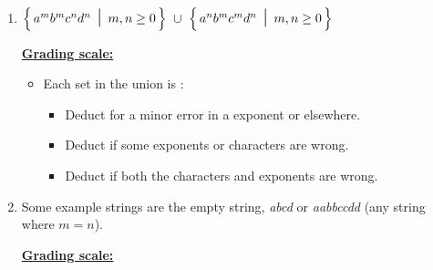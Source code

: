 \documentclass[11pt,fleqn]{article}
\begin{document}
\begin{enumerate}
\begin{enumerate}
            \item \(
                    \left\{ \,
                      a^mb^mc^nd^n \mbox{\Large \ensuremath{\ \mid \ }} m, n \ge 0  \,
                    \right\}
                    \ \cup \
                    \left\{  \,
                      a^nb^mc^md^n \mbox{\Large \ensuremath{\ \mid \ }} m, n \ge 0  \,
                    \right\}
                  \)

                  \begin{info}{\textbf{\underline{Grading scale:}}}

                    \begin{itemize}

                      \addtolength{\itemsep}{2mm}

                      \item Each set in the union is :

                            \vspace{1mm}

                            \begin{itemize}

                              \addtolength{\itemsep}{-.5mm}

                              \item Deduct  for a minor error in a
                                    exponent or elsewhere.

                              \item Deduct  if some exponents
                                    or characters are wrong.

                              \item Deduct  if both the characters
                                    and exponents are wrong.

                            \end{itemize}

                            \vspace{0mm}

                    \end{itemize}

                  \end{info}

            \item Some example strings are the empty string, \emph{abcd} or
                  \emph{aabbccdd} (any string where $m = n$).

                  \begin{info}{\textbf{\underline{Grading scale:}}}


\end{info}
\end{enumerate}
\end{enumerate}
\end{document}
